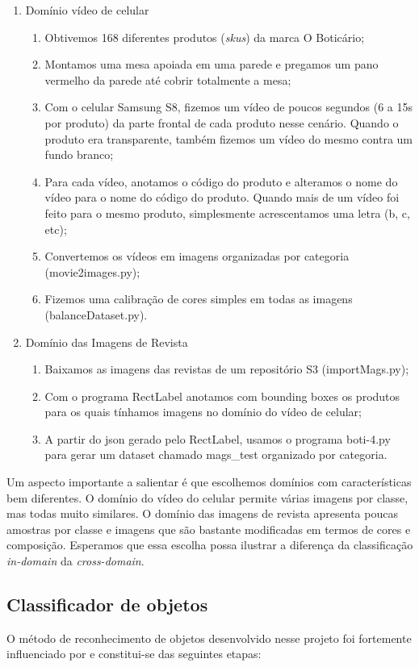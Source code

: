 \documentclass[conference]{IEEEtran}
\begin{document}
\begin{enumerate}
  \item Domínio vídeo de celular
    \begin{enumerate}
      \item Obtivemos 168 diferentes produtos (\textit{skus}) da marca O Boticário;
      \item Montamos uma mesa apoiada em uma parede e pregamos um pano vermelho da parede até cobrir totalmente a mesa;
      \item Com o celular Samsung S8, fizemos um vídeo de poucos segundos (6 a 15s por produto) da parte frontal de cada produto nesse cenário.  Quando o produto era transparente, também fizemos um vídeo do mesmo contra um fundo branco;
      \item Para cada vídeo, anotamos o código do produto e alteramos o nome do vídeo para o nome do código do produto.  Quando mais de um vídeo foi feito para o mesmo produto, simplesmente acrescentamos uma letra (b, c, etc);
      \item Convertemos os vídeos em imagens organizadas por categoria (movie2images.py);
      \item Fizemos uma calibração de cores simples em todas as imagens (balanceDataset.py).
    \end{enumerate}
  \item Domínio das Imagens de Revista
    \begin{enumerate}
      \item Baixamos as imagens das revistas de um repositório S3 (importMags.py);
      \item Com o programa RectLabel anotamos com bounding boxes os produtos para os quais tínhamos imagens no domínio do vídeo de celular;
      \item A partir do json gerado pelo RectLabel, usamos o programa boti-4.py para gerar um dataset chamado mags\_test organizado por categoria.
    \end{enumerate}
\end{enumerate}

Um aspecto importante a salientar é que escolhemos domínios com características bem diferentes. O domínio do vídeo do celular permite várias imagens por classe, mas todas muito similares. O domínio das imagens de revista apresenta poucas amostras por classe e imagens que são bastante modificadas em termos de cores e composição. Esperamos que essa escolha possa ilustrar a diferença da classificação \textit{in-domain} da \textit{cross-domain}.
 \subsection{Classificador de objetos}
O método de reconhecimento de objetos desenvolvido nesse projeto foi fortemente influenciado por \cite{fastai} e constitui-se das seguintes etapas:
\end{document}
